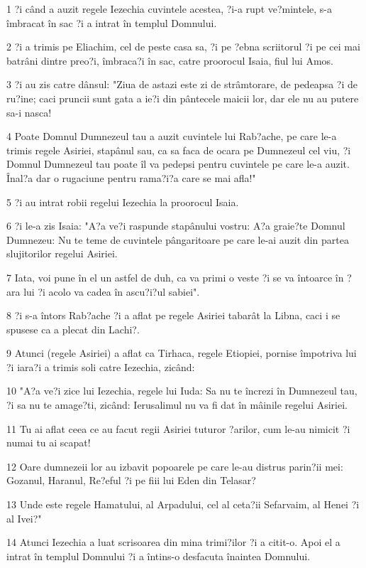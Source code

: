 \par 1 ?i când a auzit regele Iezechia cuvintele acestea, ?i-a rupt ve?mintele, s-a îmbracat în sac ?i a intrat în templul Domnului.
\par 2 ?i a trimis pe Eliachim, cel de peste casa sa, ?i pe ?ebna scriitorul ?i pe cei mai batrâni dintre preo?i, îmbraca?i în sac, catre proorocul Isaia, fiul lui Amos.
\par 3 ?i au zis catre dânsul: "Ziua de astazi este zi de strâmtorare, de pedeapsa ?i de ru?ine; caci pruncii sunt gata a ie?i din pântecele maicii lor, dar ele nu au putere sa-i nasca!
\par 4 Poate Domnul Dumnezeul tau a auzit cuvintele lui Rab?ache, pe care le-a trimis regele Asiriei, stapânul sau, ca sa faca de ocara pe Dumnezeul cel viu, ?i Domnul Dumnezeul tau poate îl va pedepsi pentru cuvintele pe care le-a auzit. Înal?a dar o rugaciune pentru rama?i?a care se mai afla!"
\par 5 ?i au intrat robii regelui Iezechia la proorocul Isaia.
\par 6 ?i le-a zis Isaia: "A?a ve?i raspunde stapânului vostru: A?a graie?te Domnul Dumnezeu: Nu te teme de cuvintele pângaritoare pe care le-ai auzit din partea slujitorilor regelui Asiriei.
\par 7 Iata, voi pune în el un astfel de duh, ca va primi o veste ?i se va întoarce în ?ara lui ?i acolo va cadea în ascu?i?ul sabiei".
\par 8 ?i s-a întors Rab?ache ?i a aflat pe regele Asiriei tabarât la Libna, caci i se spusese ca a plecat din Lachi?.
\par 9 Atunci (regele Asiriei) a aflat ca Tirhaca, regele Etiopiei, pornise împotriva lui ?i iara?i a trimis soli catre Iezechia, zicând:
\par 10 "A?a ve?i zice lui Iezechia, regele lui Iuda: Sa nu te încrezi în Dumnezeul tau, ?i sa nu te amage?ti, zicând: Ierusalimul nu va fi dat în mâinile regelui Asiriei.
\par 11 Tu ai aflat ceea ce au facut regii Asiriei tuturor ?arilor, cum le-au nimicit ?i numai tu ai scapat!
\par 12 Oare dumnezeii lor au izbavit popoarele pe care le-au distrus parin?ii mei: Gozanul, Haranul, Re?eful ?i pe fiii lui Eden din Telasar?
\par 13 Unde este regele Hamatului, al Arpadului, cel al ceta?ii Sefarvaim, al Henei ?i al Ivei?"
\par 14 Atunci Iezechia a luat scrisoarea din mina trimi?ilor ?i a citit-o. Apoi el a intrat în templul Domnului ?i a întins-o desfacuta înaintea Domnului.

